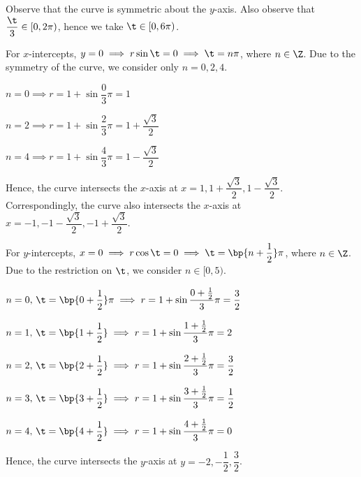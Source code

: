 \documentclass{echw}
\begin{document}
    \solution
        Observe that the curve is symmetric about the $y$-axis. Also observe that $\dfrac\t3 \in [0, 2\pi)$, hence we take $\t \in [0, 6\pi)$.
        
        For $x$-intercepts, $y = 0 \implies r\sin\t = 0 \implies \t = n\pi$, where $n \in \Z$. Due to the symmetry of the curve, we consider only $n = 0, 2, 4$.

         $n = 0 \implies r = 1 + \sin\dfrac03\pi = 1$
        
        \medskip

         $n = 2 \implies r = 1 + \sin\dfrac23\pi = 1 + \dfrac{\sqrt3}2$
        
        \medskip
        
         $n = 4 \implies r = 1 + \sin\dfrac43\pi = 1 - \dfrac{\sqrt3}2$

        Hence, the curve intersects the $x$-axis at $x = 1, 1 + \dfrac{\sqrt3}2, 1 - \dfrac{\sqrt3}2$. Correspondingly, the curve also intersects the $x$-axis at $x = -1, -1 - \dfrac{\sqrt3}2, -1 + \dfrac{\sqrt3}2$. 

        For $y$-intercepts, $x = 0 \implies r\cos\t = 0 \implies \t = \bp{n + \dfrac12}\pi$, where $n \in \Z$. Due to the restriction on $\t$, we consider $n \in [0, 5)$.

         $n = 0, \, \t=\bp{0 + \dfrac12}\pi \implies r = 1 + \sin\dfrac{0 + \frac12}3\pi = \dfrac32$

        \medskip

         $n = 1, \, \t=\bp{1 + \dfrac12}\implies r = 1 + \sin\dfrac{1 + \frac12}3\pi = 2$

        \medskip

         $n = 2, \, \t=\bp{2 + \dfrac12}\implies r = 1 + \sin\dfrac{2 + \frac12}3\pi = \dfrac32$

        \medskip

         $n = 3, \, \t=\bp{3 + \dfrac12}\implies r = 1 + \sin\dfrac{3 + \frac12}3\pi = \dfrac12$

        \medskip

         $n = 4, \, \t=\bp{4 + \dfrac12}\implies r = 1 + \sin\dfrac{4 + \frac12}3\pi = 0$

        Hence, the curve intersects the $y$-axis at $y = -2, -\dfrac12, \dfrac32$.
        
\end{document}
